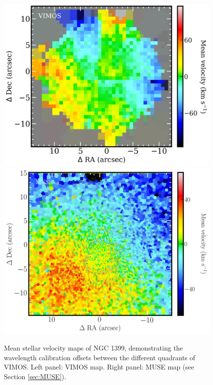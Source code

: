 		\begin{figure}
			\centering
			\includegraphics[width=.4\textwidth]{chapter2/VIMOS_NGC1399_vel.png}
			\includegraphics[width=.4\textwidth]{chapter2/MUSE_NGC1399_vel.png}
			\caption[VIMOS data wavelength calibration problems]{Mean stellar velocity maps of NGC 1399, demonstrating the wavelength calibration offsets between the different quadrants of VIMOS. Left panel: VIMOS map. Right panel: MUSE map (see Section \ref{sec:MUSE}).}
			\label{fig:egVel}
		\end{figure}

